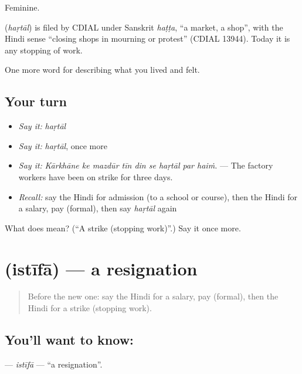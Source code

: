 Feminine.

\begin{cousinweb}
\textbf{} (\emph{haṛtāl}) is filed by CDIAL under Sanskrit \emph{haṭṭa}, \textquotedblleft{}a market, a shop\textquotedblright{}, with the Hindi sense \textquotedblleft{}closing shops in mourning or protest\textquotedblright{} (CDIAL 13944). Today it is any stopping of work.
\end{cousinweb}

\begin{grammarlens}[title={What you've built}]
One more word for describing what you lived and felt.
\end{grammarlens}

\subsection*{Your turn}
\begin{itemize}
\raggedright
  \item \emph{Say it:} \emph{haṛtāl}
  \item \emph{Say it:} \emph{haṛtāl}, once more
  \item \emph{Say it:} \emph{Kārkhāne ke mazdūr tīn din se haṛtāl par haiṁ.} — The factory workers have been on strike for three days.
  \item \emph{Recall:} say the Hindi for admission (to a school or course), then the Hindi for a salary, pay (formal), then say \emph{haṛtāl} again
\end{itemize}

\begin{tcolorbox}[breakable,colback=teal!4,colframe=teal!35!black,title={Before you move on}]
What does  mean? (\textquotedblleft{}A strike (stopping work)\textquotedblright{}.) Say it once more.
\end{tcolorbox}
\section[\texorpdfstring{\hi{इस्तीफ़ा} (istīfā)}{इस्तीफ़ा (istīfā)}]{ (istīfā) — a resignation}

\label{lesson:HI-C509-istifa}



\begin{quote}
Before the new one: say the Hindi for a salary, pay (formal), then the Hindi for a strike (stopping work).
\end{quote}

\subsection*{You'll want to know: }
\textbf{} — \emph{istīfā} — \textquotedblleft{}a resignation\textquotedblright{}.

